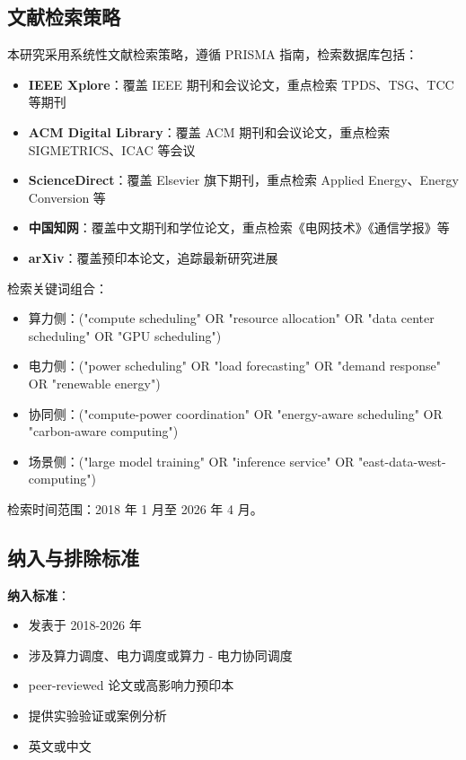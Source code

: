\documentclass[12pt,a4paper]{article}
\begin{document}
\subsection{文献检索策略}

本研究采用系统性文献检索策略，遵循 PRISMA 指南，检索数据库包括：

\begin{itemize}
    \item \textbf{IEEE Xplore}：覆盖 IEEE 期刊和会议论文，重点检索 TPDS、TSG、TCC 等期刊
    \item \textbf{ACM Digital Library}：覆盖 ACM 期刊和会议论文，重点检索 SIGMETRICS、ICAC 等会议
    \item \textbf{ScienceDirect}：覆盖 Elsevier 旗下期刊，重点检索 Applied Energy、Energy Conversion 等
    \item \textbf{中国知网}：覆盖中文期刊和学位论文，重点检索《电网技术》《通信学报》等
    \item \textbf{arXiv}：覆盖预印本论文，追踪最新研究进展
\end{itemize}

检索关键词组合：
\begin{itemize}
    \item 算力侧：("compute scheduling" OR "resource allocation" OR "data center scheduling" OR "GPU scheduling")
    \item 电力侧：("power scheduling" OR "load forecasting" OR "demand response" OR "renewable energy")
    \item 协同侧：("compute-power coordination" OR "energy-aware scheduling" OR "carbon-aware computing")
    \item 场景侧：("large model training" OR "inference service" OR "east-data-west-computing")
\end{itemize}

检索时间范围：2018 年 1 月至 2026 年 4 月。

\subsection{纳入与排除标准}

\textbf{纳入标准}：
\begin{itemize}
    \item 发表于 2018-2026 年
    \item 涉及算力调度、电力调度或算力 - 电力协同调度
    \item peer-reviewed 论文或高影响力预印本
    \item 提供实验验证或案例分析
    \item 英文或中文
\end{itemize}
\end{document}
